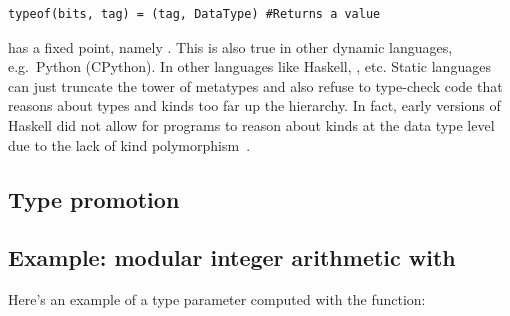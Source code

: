 \documentclass[pldi]{sigplanconf-pldi15}
\begin{document}
\begin{verbatim}
typeof(bits, tag) = (tag, DataType) #Returns a value
\end{verbatim}

 has a fixed point, namely . This is
also true in other dynamic languages, e.g.\ Python (CPython). In other
languages like Haskell, , etc. Static languages
can just truncate the tower of metatypes and also refuse to type-check code
that reasons about types and kinds too far up the hierarchy. In fact, early
versions of Haskell did not allow for programs to reason about kinds at the
data type level due to the lack of kind polymorphism~\cite{haskellkindtypes}.



\subsection{Type promotion}

\subsection{Example: modular integer arithmetic with }

Here's an example of a type parameter computed with the  function:
\end{document}
